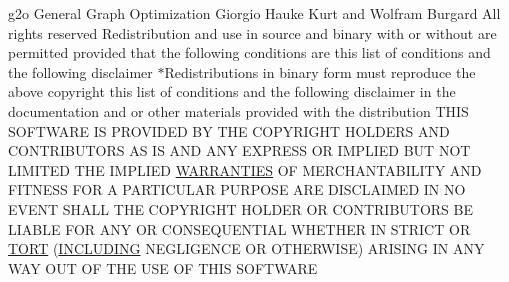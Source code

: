 \begin{DoxyCompactItemize}
\item 
g2o General Graph Optimization Giorgio Hauke Kurt and Wolfram Burgard All rights reserved Redistribution and use in source and binary with or without are permitted provided that the following conditions are this list of conditions and the following disclaimer $\ast$Redistributions in binary form must reproduce the above copyright this list of conditions and the following disclaimer in the documentation and or other materials provided with the distribution T\+H\+IS S\+O\+F\+T\+W\+A\+RE IS P\+R\+O\+V\+I\+D\+ED BY T\+HE C\+O\+P\+Y\+R\+I\+G\+HT H\+O\+L\+D\+E\+RS A\+ND C\+O\+N\+T\+R\+I\+B\+U\+T\+O\+RS AS IS A\+ND A\+NY E\+X\+P\+R\+E\+SS OR I\+M\+P\+L\+I\+ED B\+UT N\+OT L\+I\+M\+I\+T\+ED T\+HE I\+M\+P\+L\+I\+ED \hyperlink{license-bsd_8txt_aada97a6c44c9b8b4b0cfb3a641d0fe51}{W\+A\+R\+R\+A\+N\+T\+I\+ES} OF M\+E\+R\+C\+H\+A\+N\+T\+A\+B\+I\+L\+I\+TY A\+ND F\+I\+T\+N\+E\+SS F\+OR A P\+A\+R\+T\+I\+C\+U\+L\+AR P\+U\+R\+P\+O\+SE A\+RE D\+I\+S\+C\+L\+A\+I\+M\+ED IN NO E\+V\+E\+NT S\+H\+A\+LL T\+HE C\+O\+P\+Y\+R\+I\+G\+HT H\+O\+L\+D\+ER OR C\+O\+N\+T\+R\+I\+B\+U\+T\+O\+RS BE L\+I\+A\+B\+LE F\+OR A\+NY OR C\+O\+N\+S\+E\+Q\+U\+E\+N\+T\+I\+AL W\+H\+E\+T\+H\+ER IN S\+T\+R\+I\+CT OR \hyperlink{license-bsd_8txt_a19dae9fe04d0db5e029717af14e03a28}{T\+O\+RT} (\hyperlink{license-bsd_8txt_aad5ea521b66beb52ecca7b476bdbf706}{I\+N\+C\+L\+U\+D\+I\+NG} N\+E\+G\+L\+I\+G\+E\+N\+CE OR O\+T\+H\+E\+R\+W\+I\+SE) A\+R\+I\+S\+I\+NG IN A\+NY W\+AY O\+UT OF T\+HE U\+SE OF T\+H\+IS S\+O\+F\+T\+W\+A\+RE
\end{DoxyCompactItemize}
